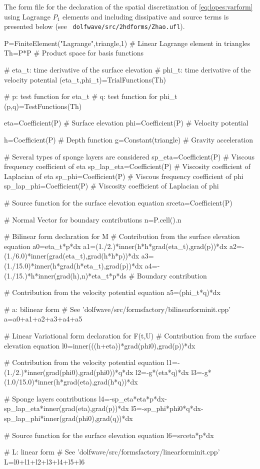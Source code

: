 The \ufl form file for the declaration of the spatial
discretization of \eqref{eq:lopes:varform} using Lagrange
$P_1$ elements and including  dissipative and
source terms is presented below (see {\tt
  dolfwave/src/2hdforms/Zhao.ufl}).
\begin{python}
P=FiniteElement("Lagrange",triangle,1) # Linear Lagrange element in triangles
Th=P*P # Product space for basis functions

# eta_t: time derivative of the surface elevation
# phi_t: time derivative of the velocity potential
(eta_t,phi_t)=TrialFunctions(Th)

# p: test function for eta_t
# q: test function for phi_t
(p,q)=TestFunctions(Th)

eta=Coefficient(P) # Surface elevation
phi=Coefficient(P) # Velocity potential

h=Coefficient(P) # Depth function
g=Constant(triangle) # Gravity acceleration

# Several types of sponge layers are considered
sp_eta=Coefficient(P) # Viscous frequency coefficient of eta
sp_lap_eta=Coefficient(P) # Viscosity coefficient of Laplacian of eta
sp_phi=Coefficient(P) # Viscous frequency coefficient of phi
sp_lap_phi=Coefficient(P) # Viscosity coefficient of Laplacian of phi

# Source function for the surface elevation equation
srceta=Coefficient(P)

# Normal Vector for boundary contributions
n=P.cell().n

# Bilinear form declaration for M
# Contribution from the surface elevation equation
a0=eta_t*p*dx
a1=(1./2.)*inner(h*h*grad(eta_t),grad(p))*dx
a2=-(1./6.0)*inner(grad(eta_t),grad(h*h*p))*dx
a3=(1./15.0)*inner(h*grad(h*eta_t),grad(p))*dx
a4=-(1./15.)*h*inner(grad(h),n)*eta_t*p*ds # Boundary contribution

# Contribution from the velocity potential equation
a5=(phi_t*q)*dx

# a: bilinear form
# See 'dolfwave/src/formsfactory/bilinearforminit.cpp'
a=a0+a1+a2+a3+a4+a5

# Linear Variational form declaration for F(t,U)
# Contribution from the surface elevation equation
l0=inner(((h+eta))*grad(phi0),grad(p))*dx

# Contribution from the velocity potential equation
l1=-(1./2.)*inner(grad(phi0),grad(phi0))*q*dx
l2=-g*(eta*q)*dx
l3=-g*(1.0/15.0)*inner(h*grad(eta),grad(h*q))*dx

# Sponge layers contributions
l4=-sp_eta*eta*p*dx-sp_lap_eta*inner(grad(eta),grad(p))*dx
l5=-sp_phi*phi0*q*dx-sp_lap_phi*inner(grad(phi0),grad(q))*dx

# Source function for the surface elevation equation
l6=srceta*p*dx

# L: linear form
# See 'dolfwave/src/formsfactory/linearforminit.cpp'
L=l0+l1+l2+l3+l4+l5+l6
\end{python}

